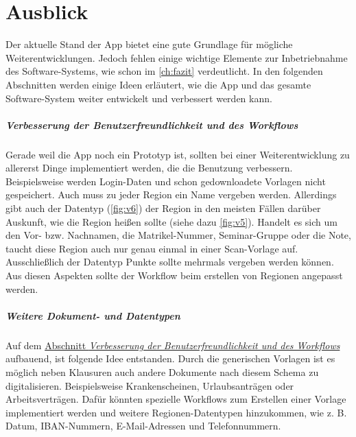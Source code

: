 \documentclass[notables, nomenclature, oneside, 150]{HSMW-Thesis}
\begin{document}
		
\chapter{Ausblick}\label{ch:ausblick}
	Der aktuelle Stand der App bietet eine gute Grundlage für mögliche Weiterentwicklungen. Jedoch fehlen einige wichtige Elemente zur Inbetriebnahme des Software-Systems, wie schon im \autoref{ch:fazit} verdeutlicht. In den folgenden Abschnitten werden einige Ideen erläutert, wie die App und das gesamte Software-System weiter entwickelt und verbessert werden kann.

	\paragraph*{Verbesserung der Benutzerfreundlichkeit und des Workflows} \label{pa:benutzer} 
		Gerade weil die App noch ein Prototyp ist, sollten bei einer Weiterentwicklung zu allererst Dinge implementiert werden, die die Benutzung verbessern. Beispielsweise werden Login-Daten und schon gedownloadete Vorlagen nicht gespeichert. Auch muss zu jeder Region ein Name vergeben werden. Allerdings gibt auch der Datentyp (\ref{fig:v6}) der Region in den meisten Fällen darüber Auskunft, wie die Region heißen sollte (siehe dazu \autoref{fig:v5}). Handelt es sich um den Vor- bzw. Nachnamen, die Matrikel-Nummer, Seminar-Gruppe oder die Note, taucht diese Region auch nur genau einmal in einer Scan-Vorlage auf. Ausschließlich der Datentyp Punkte sollte mehrmals vergeben werden können. Aus diesen Aspekten sollte der Workflow beim erstellen von Regionen angepasst werden. 
	
	\paragraph*{Weitere Dokument- und Datentypen} 
		Auf dem \hyperref[pa:benutzer]{Abschnitt \textit{Verbesserung der Benutzerfreundlichkeit und des Workflows}} \xspace aufbauend, ist folgende Idee entstanden. Durch die generischen Vorlagen ist es möglich neben Klausuren auch andere Dokumente nach diesem Schema zu digitalisieren. Beispielsweise Krankenscheinen, Urlaubsanträgen oder Arbeitsverträgen. Dafür könnten spezielle Workflows zum Erstellen einer Vorlage implementiert werden und weitere Regionen-Datentypen hinzukommen, wie z. B. Datum, IBAN-Nummern, E-Mail-Adressen und Telefonnummern.
	
\end{document}
